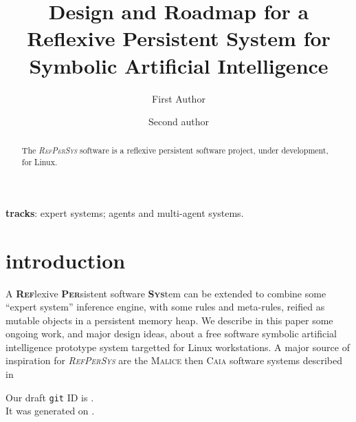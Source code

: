 \documentclass{svproc}
\begin{document}


\newcommand{\RefPerSys}[0]{{\textit{\textsc{RefPerSys}}}}

\mainmatter              %
%
\title{Design and Roadmap for a Reflexive Persistent System for
  Symbolic Artificial Intelligence} \titlerunning{\RefPerSys}
\author{First Author \and Second author} 


\maketitle

\begin{abstract}
  The \RefPerSys{} software is a reflexive persistent software project, under development, for Linux.
\end{abstract}

\textbf{tracks}: expert systems; agents and multi-agent systems.

\section{introduction}

A \textsc{\textbf{Ref}}lexive \textsc{\textbf{Per}}sistent software
\textsc{\textbf{Sys}}tem can be extended to combine some ``expert
system'' inference engine, with some rules and meta-rules, reified as
mutable objects in a persistent memory heap. We describe in this paper
some ongoing work, and major design ideas, about a free software
symbolic artificial intelligence prototype system targetted for Linux
workstations. A major source of inspiration for \RefPerSys{} are the
\textsc{Malice} then \textsc{Caia} software systems
described in
\cite{Pitrat:1996:FGCS, Pitrat:2009:AST,  Pitrat:2009:ArtifBeings}



\begin{flushright}
  \begin{relsize}{-1}
    Our draft \texttt{git} ID is \texttt{\textit{\rpsgitcommit}}. \\
    It was generated on \texttt{\rpsdate}.
  \end{relsize}
\end{flushright}
\end{document}
